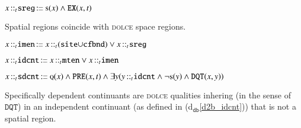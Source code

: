 \documentclass[ao]{iosart2x}
\newcommand{\dolceThrLabel}{\textrm{t$_\texttt{d}$}}
\newcommand{\dbDefLabel}{\textrm{d$_\texttt{db}$}}
\newcounter{cntdbdf}
\newcommand{\dbdf}[1]{\refstepcounter{cntdbdf}\begin{small}{\bf \dbDefLabel\thecntdbdf\label{#1}}\end{small}}
\newcommand{\refdolceth}[1]{({\dolceThrLabel}\ref{#1})}
\newcommand{\refdbdf}[1]{({\dbDefLabel}\ref{#1})}
\newcommand{\pr}[1]{\mathtt{#1}}
\newcommand{\cn}[1]{\mathtt{#1}}
\newcommand\textequal{%
 \rule[.08ex]{5pt}{0.35pt}\llap{\rule[.78ex]{5pt}{0.35pt}}}
\newcommand{\sdef}{{\hspace{1.5pt}:\hspace{-2.5pt}\textequal\hspace{3pt}}}
\newcommand{\dolce}{{\textsc{dolce}}}
\newcommand{\bfo}{{\textsc{bfo}}}
\newcommand {\Mdcat} {\textsc{m}}
\newcommand {\Fdcat} {\textsc{f}}
\newcommand {\Qdcat} {\textsc{q}}
\newcommand {\Sdcat} {\textsc{s}}
\newcommand {\TPd} {\ensuremath{\pr{tP}}}
\newcommand {\Pd} {\ensuremath{\pr{P}}}
\newcommand {\PREd} {\ensuremath{\pr{PRE}}}
\newcommand {\DQTd} {\ensuremath{\pr{DQT}}}
\newcommand {\SDd} {\ensuremath{\pr{SD}}}
\newcommand {\Kd} {\ensuremath{\pr{K}}}
\newcommand {\SLCd} {\ensuremath{\pr{SLC}}}
\newcommand{\idcntbcat}{\cn{idcnt}}
\newcommand{\sdcntbcat}{\cn{sdcnt}}
\newcommand{\mtenbcat}{\cn{mten}}
\newcommand{\imenbcat}{\cn{imen}}
\newcommand{\sitebcat}{\cn{site}}
\newcommand{\cfbndbcat}{\cn{cfbnd}}
\newcommand{\sregbcat}{\cn{sreg}}
\newcommand{\rlzenbcat}{\cn{rlzen}}
\newcommand{\tregbcat}{\cn{treg}}
\newcommand{\qltbcat}{\cn{qlt}}
\newcommand{\bfoexist}{\pr{EX}}
\newcommand{\bfoiof}[1]{{\,::_{#1\:\!}}}
\begin{document}
%
%
%

\item[\dbdf{d2b_sreg}] $x \bfoiof{t} \sregbcat \sdef \Sdcat(x) \land \bfoexist(x,t)$

\vspace{1pt}
Spatial regions coincide with {\dolce} space regions.


\item[\dbdf{d2b_imen}] $x \bfoiof{t} \imenbcat \sdef x \bfoiof{t} (\sitebcat{\cup}\cfbndbcat) \lor x \bfoiof{t} \sregbcat$

\item[\dbdf{d2b_idcnt}] $x \bfoiof{t} \idcntbcat \sdef x \bfoiof{t} \mtenbcat \lor x \bfoiof{t} \imenbcat$

\item[\dbdf{d2b_sdcnt}] $x \bfoiof{t} \sdcntbcat \sdef \Qdcat(x) \land \PREd(x,t) \land \exists y(y \bfoiof{t} \idcntbcat \land \neg\Sdcat(y) \land \DQTd(x,y))$

\vspace{1pt}
Specifically dependent continuants are {\dolce} qualities inhering (in the sense of $\DQTd$) in an independent continuant (as defined in \refdbdf{d2b_idcnt}) that is not a spatial region.

%
%
%
%
\end{document}
